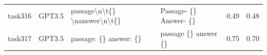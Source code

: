 \begin{longtable}{@{}p{0.8cm\tiny}p{1cm\tiny}p{4.1cm\ttfamily\tiny}p{4.1cm\ttfamily\tiny}p{0.8cm\tiny}p{0.8cm\tiny}@{}}
task316   & GPT3.5    & passage\textbackslash{}n\textbackslash{}t\{\} \textbackslash{}nanswer\textbackslash{}n\textbackslash{}t\{\}                                                                                                                                                                                                                                                                                                                                                                                                             & Passage- \{\}  Answer- \{\}                                                                                                                                                                                                                                                                                                                                                                                                                                                                                                                                                       & 0.49 & 0.48 \\
task317   & GPT3.5    & passage: \{\}  answer: \{\}                                                                                                                                                                                                                                                                                                                                                                                                                                                                                             & passage \{\} answer \{\}                                                                                                                                                                                                                                                                                                                                                                                                                                                                                                                                                          & 0.75 & 0.70 \\

\end{longtable}
